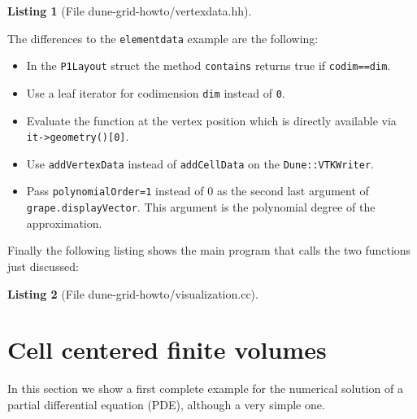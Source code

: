 \documentclass[11pt,a4paper,headinclude,footinclude,DIV16,normalheadings]{scrreprt}
\newtheorem{lst}{Listing}
\begin{document}
\begin{lst}[File dune-grid-howto/vertexdata.hh] \mbox{}
\nopagebreak

\end{lst}

The differences to the \lstinline!elementdata! example are the
following:
\begin{itemize}
\item In the \lstinline!P1Layout! struct the method
  \lstinline!contains! returns true if \lstinline!codim==dim!.
\item Use a leaf iterator for codimension \lstinline!dim! instead of
  \lstinline!0!.
\item Evaluate the function at the vertex position which is directly
  available via \lstinline!it->geometry()[0]!.
\item Use \lstinline!addVertexData! instead of \lstinline!addCellData!
  on the \lstinline!Dune::VTKWriter!.
\item Pass \lstinline!polynomialOrder=1! instead of 0 as 
the second last argument of \lstinline!grape.displayVector!. This argument is the polynomial
  degree of the approximation.
\end{itemize}

Finally the following listing shows the main program that calls the
two functions just discussed:

\begin{lst}[File dune-grid-howto/visualization.cc] \mbox{}
\nopagebreak

\end{lst}

\section{Cell centered finite volumes}
\label{Sec:CellCenteredFV}

In this section we show a first complete example for the numerical
solution of a partial differential equation (PDE), although a very simple
one.
\end{document}
